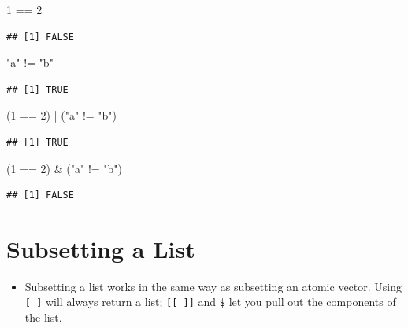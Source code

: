 \documentclass[]{book}
\newenvironment{Shaded}{\begin{snugshade}}{\end{snugshade}}
\newcommand{\DecValTok}[1]{\textcolor[rgb]{0.00,0.00,0.81}{{#1}}}
\newcommand{\StringTok}[1]{\textcolor[rgb]{0.31,0.60,0.02}{{#1}}}
\newcommand{\NormalTok}[1]{{#1}}
\providecommand{\tightlist}{%
  \setlength{\itemsep}{0pt}\setlength{\parskip}{0pt}}
\begin{document}
\begin{Shaded}
\begin{Highlighting}[]
\DecValTok{1} \NormalTok{==}\StringTok{ }\DecValTok{2}
\end{Highlighting}
\end{Shaded}

\begin{verbatim}
## [1] FALSE
\end{verbatim}

\begin{Shaded}
\begin{Highlighting}[]
\StringTok{"a"} \NormalTok{!=}\StringTok{ "b"}
\end{Highlighting}
\end{Shaded}

\begin{verbatim}
## [1] TRUE
\end{verbatim}

\begin{Shaded}
\begin{Highlighting}[]
\NormalTok{(}\DecValTok{1} \NormalTok{==}\StringTok{ }\DecValTok{2}\NormalTok{) |}\StringTok{ }\NormalTok{(}\StringTok{"a"} \NormalTok{!=}\StringTok{ "b"}\NormalTok{)}
\end{Highlighting}
\end{Shaded}

\begin{verbatim}
## [1] TRUE
\end{verbatim}

\begin{Shaded}
\begin{Highlighting}[]
\NormalTok{(}\DecValTok{1} \NormalTok{==}\StringTok{ }\DecValTok{2}\NormalTok{) &}\StringTok{ }\NormalTok{(}\StringTok{"a"} \NormalTok{!=}\StringTok{ "b"}\NormalTok{)}
\end{Highlighting}
\end{Shaded}

\begin{verbatim}
## [1] FALSE
\end{verbatim}

\section{Subsetting a List}\label{subsetting-a-list}

\begin{itemize}
\tightlist
\item
  Subsetting a list works in the same way as subsetting an atomic
  vector. Using \texttt{{[}\ {]}} will always return a list;
  \texttt{{[}{[}\ {]}{]}} and \texttt{\$} let you pull out the
  components of the list.
\end{itemize}
\end{document}
